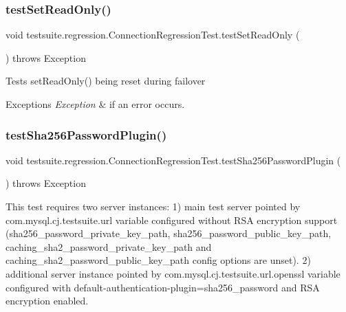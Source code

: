 \subsubsection{\texorpdfstring{test\+Set\+Read\+Only()}{testSetReadOnly()}}
{\footnotesize\ttfamily void testsuite.\+regression.\+Connection\+Regression\+Test.\+test\+Set\+Read\+Only (\begin{DoxyParamCaption}{ }\end{DoxyParamCaption}) throws Exception}

Tests set\+Read\+Only() being reset during failover


\begin{DoxyExceptions}{Exceptions}
{\em Exception} & if an error occurs. \\
\hline
\end{DoxyExceptions}
\mbox{\label{classtestsuite_1_1regression_1_1_connection_regression_test_a40ea24784903b1b96d51638e255bce89}} 
\subsubsection{\texorpdfstring{test\+Sha256\+Password\+Plugin()}{testSha256PasswordPlugin()}}
{\footnotesize\ttfamily void testsuite.\+regression.\+Connection\+Regression\+Test.\+test\+Sha256\+Password\+Plugin (\begin{DoxyParamCaption}{ }\end{DoxyParamCaption}) throws Exception}

This test requires two server instances\+: 1) main test server pointed by com.\+mysql.\+cj.\+testsuite.\+url variable configured without R\+SA encryption support (sha256\+\_\+password\+\_\+private\+\_\+key\+\_\+path, sha256\+\_\+password\+\_\+public\+\_\+key\+\_\+path, caching\+\_\+sha2\+\_\+password\+\_\+private\+\_\+key\+\_\+path and caching\+\_\+sha2\+\_\+password\+\_\+public\+\_\+key\+\_\+path config options are unset). 2) additional server instance pointed by com.\+mysql.\+cj.\+testsuite.\+url.\+openssl variable configured with default-\/authentication-\/plugin=sha256\+\_\+password and R\+SA encryption enabled.

